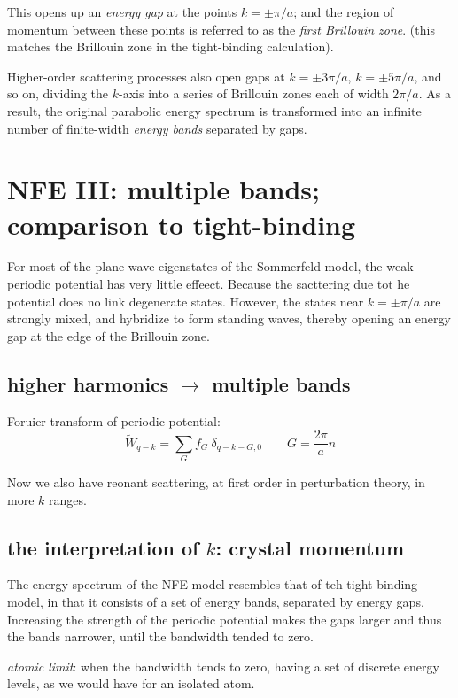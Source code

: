 \documentclass[10pt, a4paper, twocolumn]{article}
\newcommand{\deff}[1]{\par \noindent \textit{#1}: }
\begin{document}
This opens up an \emph{energy gap} at the points $k=\pm \pi/a$; and the region of momentum between these points is referred to as the \emph{first Brillouin zone}. (this matches the Brillouin zone in the tight-binding calculation).

Higher-order scattering processes also open gaps at $k=\pm3\pi/a$, $k=\pm 5\pi/a$, and so on, dividing the $k$-axis into a series of Brillouin zones each of width $2\pi/a$. As a result, the original parabolic energy spectrum is transformed into an infinite number of finite-width \emph{energy bands} separated by gaps.

\section{NFE III: multiple bands; comparison to tight-binding}

For most of the plane-wave eigenstates of the Sommerfeld model, the weak periodic potential has very little effeect. Because the sacttering due tot he potential does no link degenerate states. However, the states near $k=\pm\pi/a$ are strongly mixed, and hybridize to form standing waves, thereby opening an energy gap at the edge of the Brillouin zone.

\subsection{higher harmonics $\rightarrow$ multiple bands}

Foruier transform of periodic potential:
\[\tilde W _{q-k} = \sum _Gf_G\ \delta _{q-k-G,0}
\qquad G = \frac{2\pi}{a}n \]

Now we also have reonant scattering, at first order in perturbation theory, in more $k$ ranges.

\subsection{the interpretation of $k$: crystal momentum}

The energy spectrum of the NFE model resembles that of teh tight-binding model, in that it consists of a set of energy bands, separated by energy gaps. Increasing the strength of the periodic potential makes the gaps larger and thus the bands narrower, until the bandwidth tended to zero.

\deff{atomic limit} when the bandwidth tends to zero, having a set of discrete energy levels, as we would have for an isolated atom.
\end{document}
